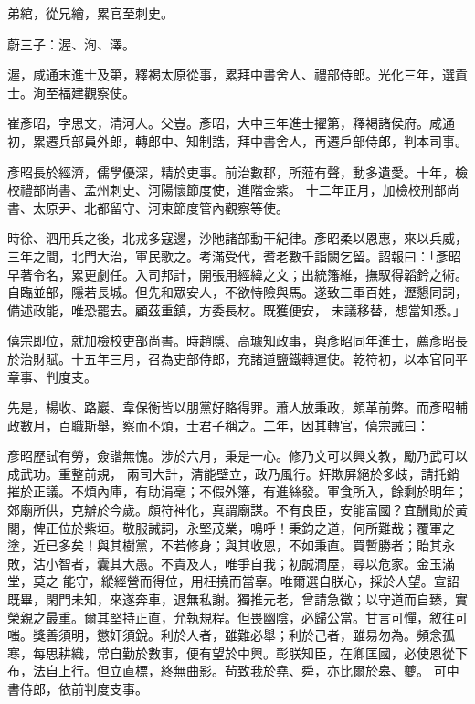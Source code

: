 \begin{pinyinscope}
 弟綰，從兄繪，累官至刺史。



 蔚三子：渥、洵、澤。



 渥，咸通末進士及第，釋褐太原從事，累拜中書舍人、禮部侍郎。光化三年，選貢士。洵至福建觀察使。



 崔彥昭，字思文，清河人。父豈。彥昭，大中三年進士擢第，釋褐諸侯府。咸通初，累遷兵部員外郎，轉郎中、知制誥，拜中書舍人，再遷戶部侍郎，判本司事。



 彥昭長於經濟，儒學優深，精於吏事。前治數郡，所蒞有聲，動多遺愛。十年，檢校禮部尚書、孟州刺史、河陽懷節度使，進階金紫。
 十二年正月，加檢校刑部尚書、太原尹、北都留守、河東節度管內觀察等使。



 時徐、泗用兵之後，北戎多寇邊，沙阤諸部動干紀律。彥昭柔以恩惠，來以兵威，三年之間，北門大治，軍民歌之。考滿受代，耆老數千詣闕乞留。詔報曰：「彥昭早著令名，累更劇任。入司邦計，開張用經緯之文；出統籓維，撫馭得韜鈐之術。自臨並部，隱若長城。但先和眾安人，不欲恃險與馬。遂致三軍百姓，瀝懇同詞，備述政能，唯恐罷去。顧茲重鎮，方委長材。既獲便安，
 未議移替，想當知悉。」



 僖宗即位，就加檢校吏部尚書。時趙隱、高璩知政事，與彥昭同年進士，薦彥昭長於治財賦。十五年三月，召為吏部侍郎，充諸道鹽鐵轉運使。乾符初，以本官同平章事、判度支。



 先是，楊收、路巖、韋保衡皆以朋黨好賂得罪。蕭人放秉政，頗革前弊。而彥昭輔政數月，百職斯舉，察而不煩，士君子稱之。二年，因其轉官，僖宗誡曰：



 彥昭歷試有勞，僉諧無愧。涉於六月，秉是一心。修乃文可以興文教，勵乃武可以成武功。重整前規，
 兩司大計，清能壁立，政乃風行。奸欺屏絕於多歧，請托銷摧於正議。不煩內庫，有助涓毫；不假外籓，有進絲發。軍食所入，餘剩於明年；郊廟所供，克辦於今歲。頗符神化，真謂廟謀。不有良臣，安能富國？宜酬勛於黃閣，俾正位於紫垣。敬服誡詞，永堅茂業，鳴呼！秉鈞之道，何所難哉；覆軍之塗，近已多矣！與其樹黨，不若修身；與其收恩，不如秉直。買暫勝者；貽其永敗，沽小智者，囊其大愚。不貴及人，唯爭自我；初誠潤屋，尋以危家。金玉滿堂，莫之
 能守，縱經營而得位，用枉撓而當辜。唯爾選自朕心，採於人望。宣詔既畢，閑門未知，來遂奔車，退無私謝。獨推元老，曾請急徵；以守道而自臻，實榮親之最重。爾其堅持正直，允執規程。但畏幽陰，必歸公當。甘言可憚，敘往可嗤。獎善須明，懲奸須銳。利於人者，雖難必舉；利於己者，雖易勿為。頻念孤寒，每思耕織，常自勤於數事，便有望於中興。彰朕知臣，在卿匡國，必使恩從下布，法自上行。但立直標，終無曲影。茍致我於堯、舜，亦比爾於皋、夔。
 可中書侍郎，依前判度支事。




\end{pinyinscope}
